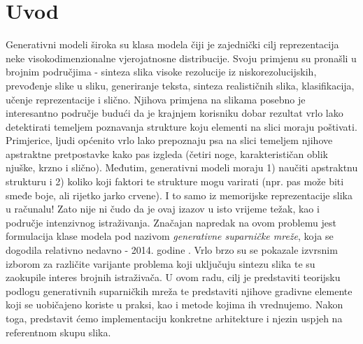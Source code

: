 \chapter{Uvod}
Generativni modeli široka su klasa modela čiji je zajednički cilj reprezentacija neke visokodimenzionalne vjerojatnosne distribucije. Svoju primjenu su pronašli u brojnim područjima - sinteza slika visoke rezolucije iz niskorezolucijskih, prevođenje slike u sliku, generiranje teksta, sinteza realističnih slika, klasifikacija, učenje reprezentacije i slično.
Njihova primjena na slikama posebno je interesantno područje budući da je krajnjem korisniku dobar rezultat vrlo lako detektirati temeljem poznavanja strukture koju elementi na slici moraju poštivati. Primjerice, ljudi općenito vrlo lako prepoznaju psa na slici temeljem njihove apstraktne pretpostavke kako pas izgleda (četiri noge, karakterističan oblik njuške, krzno i slično). Međutim, generativni modeli moraju 1) naučiti apstraktnu strukturu i 2) koliko koji faktori te strukture mogu varirati (npr. pas može biti smeđe boje, ali rijetko jarko crvene). I to samo iz memorijske reprezentacije slika u računalu! Zato nije ni čudo da je ovaj izazov u isto vrijeme težak, kao i područje intenzivnog istraživanja.
Značajan napredak na ovom problemu jest formulacija klase modela pod nazivom \textit{generativne suparničke mreže}, koja se dogodila relativno nedavno - 2014. godine \citep{orig_paper}. Vrlo brzo su se pokazale izvrsnim izborom za različite varijante problema koji uključuju sintezu slika te su zaokupile interes brojnih istraživača.
U ovom radu, cilj je predstaviti teorijsku podlogu generativnih suparničkih mreža te predstaviti njihove gradivne elemente koji se uobičajeno koriste u praksi, kao i metode kojima ih vrednujemo. Nakon toga, predstavit ćemo implementaciju konkretne arhitekture i njezin uspjeh na referentnom skupu slika.